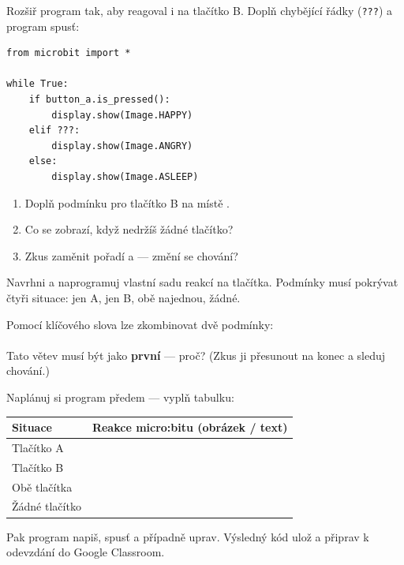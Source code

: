 \begin{ukol}

Rozšiř program tak, aby reagoval i na tlačítko B.
Doplň chybějící řádky (\texttt{???}) a program spusť:

\begin{lstlisting}
from microbit import *

while True:
    if button_a.is_pressed():
        display.show(Image.HAPPY)
    elif ???:
        display.show(Image.ANGRY)
    else:
        display.show(Image.ASLEEP)
\end{lstlisting}

\begin{enumerate}
  \item Doplň podmínku pro tlačítko B na místě .
  \item Co se zobrazí, když nedržíš žádné tlačítko?
  \item Zkus zaměnit pořadí  a  — změní se chování?
\end{enumerate}

\odpoved[2cm]

\end{ukol}

\begin{ukol}

Navrhni a naprogramuj vlastní sadu reakcí na tlačítka. Podmínky musí pokrývat
čtyři situace: jen A, jen B, obě najednou, žádné.

\begin{tcolorbox}[colback=yellow!12, colframe=orange!70!black,
                  fonttitle=\small\bfseries, title=Tip: obě tlačítka najednou]
  \small
  Pomocí klíčového slova  lze zkombinovat dvě podmínky:\\[4pt]
  \\[4pt]
  Tato větev musí být jako \textbf{první} — proč? (Zkus ji přesunout na konec a sleduj chování.)
\end{tcolorbox}

\medskip
Naplánuj si program předem — vyplň tabulku:

\medskip
\begin{center}
\begin{tabular}{lp{7cm}}
  \toprule
  \textbf{Situace} & \textbf{Reakce micro:bitu (obrázek / text)} \\
  \midrule
  Tlačítko A & \\[8pt]
  Tlačítko B & \\[8pt]
  Obě tlačítka & \\[8pt]
  Žádné tlačítko & \\[8pt]
  \bottomrule
\end{tabular}
\end{center}

\medskip
Pak program napiš, spusť a případně uprav.
Výsledný kód ulož a připrav k odevzdání do Google Classroom.

\end{ukol}

